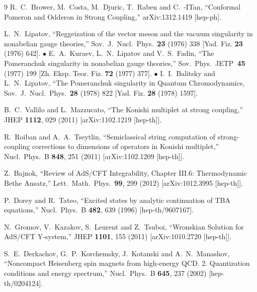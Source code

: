 \documentclass[a4paper,11pt]{article}
\numberwithin{equation}{section}
\begin{document}
\begin{thebibliography} {9}
  R.~C.~Brower, M.~Costa, M.~Djuric, T.~Raben and C.~-ITan,
  ``Conformal Pomeron and Odderon in Strong Coupling,''
  arXiv:1312.1419 [hep-ph].

  L.~N.~Lipatov, ``Reggeization of the vector meson and the vacuum singularity in nonabelian gauge theories,'' Sov.\ J.\ Nucl.\ Phys.\ {\bf 23} (1976) 338 [Yad. Fiz. {\bf 23} (1976) 642]. $\bullet$
  E.~A.~Kuraev, L.~N.~Lipatov and V.~S.~Fadin, ``The Pomeranchuk singularity in nonabelian gauge theories,'' Sov.\ Phys.\ JETP\ {\bf 45} (1977) 199 [Zh. Eksp. Teor. Fiz. {\bf 72} (1977) 377]. $\bullet$
  I.~I.~Balitsky and L.~N.~Lipatov, ``The Pomeranchuk singularity in Quantum Chromodynamics,\\ Sov.\ J.\ Nucl.\ Phys.\ {\bf 28} (1978) 822 [Yad. Fiz. {\bf 28} (1978) 1597].

  B.~C.~Vallilo and L.~Mazzucato,
  ``The Konishi multiplet at strong coupling,''
  JHEP {\bf 1112}, 029 (2011)
  [arXiv:1102.1219 [hep-th]].

  R.~Roiban and A.~A.~Tseytlin,
  ``Semiclassical string computation of strong-coupling corrections to dimensions of operators in Konishi multiplet,''
  Nucl.\ Phys.\ B {\bf 848}, 251 (2011)
  [arXiv:1102.1209 [hep-th]].

  Z.~Bajnok,
  ``Review of AdS/CFT Integrability, Chapter III.6: Thermodynamic Bethe Ansatz,''
  Lett.\ Math.\ Phys.\  {\bf 99}, 299 (2012)
  [arXiv:1012.3995 [hep-th]].

  P.~Dorey and R.~Tateo,
  ``Excited states by analytic continuation of TBA equations,''
  Nucl.\ Phys.\ B {\bf 482}, 639 (1996)
  [hep-th/9607167].

  N.~Gromov, V.~Kazakov, S.~Leurent and Z.~Tsuboi,
  ``Wronskian Solution for AdS/CFT Y-system,''
  JHEP {\bf 1101}, 155 (2011)
  [arXiv:1010.2720 [hep-th]].

  S.~E.~Derkachov, G.~P.~Korchemsky, J.~Kotanski and A.~N.~Manashov,
  ``Noncompact Heisenberg spin magnets from high-energy QCD. 2. Quantization conditions and energy spectrum,''
  Nucl.\ Phys.\ B {\bf 645}, 237 (2002)
  [hep-th/0204124].


\end{thebibliography}
\end{document}
